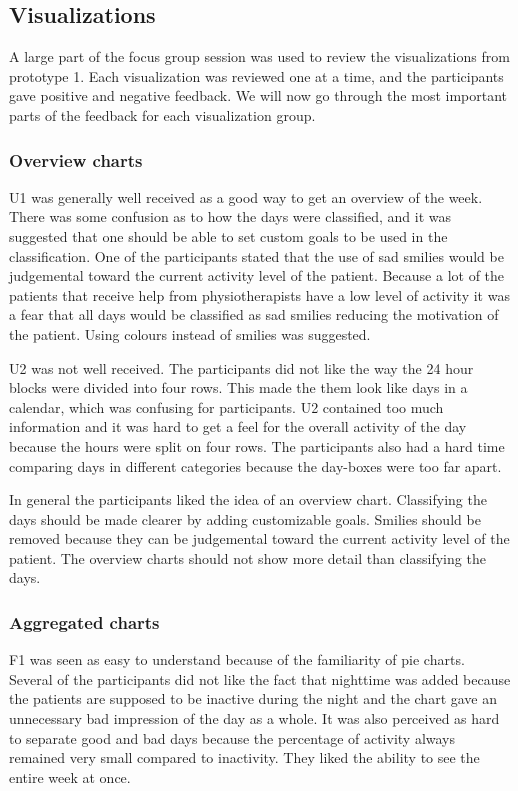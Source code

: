 \subsection{Visualizations}
A large part of the focus group session was used to review the visualizations from prototype 1. Each visualization was reviewed one at a time, and the participants gave positive and negative feedback. We will now go through the most important parts of the feedback for each visualization group.

\subsubsection{Overview charts}
U1 was generally well received as a good way to get an overview of the week. There was some confusion as to how the days were classified, and it was suggested that one should be able to set custom goals to be used in the classification. One of the participants stated that the use of sad smilies would be judgemental toward the current activity level of the patient. Because a lot of the patients that receive help from physiotherapists have a low level of activity it was a fear that all days would be classified as sad smilies reducing the motivation of the patient. Using colours instead of smilies was suggested.

U2 was not well received. The participants did not like the way the 24 hour blocks were divided into four rows. This made the them look like days in a calendar, which was confusing for participants. U2 contained too much information and it was hard to get a feel for the overall activity of the day because the hours were split on four rows. The participants also had a hard time comparing days in different categories because the day-boxes were too far apart.

In general the participants liked the idea of an overview chart. Classifying the days should be made clearer by adding customizable goals. Smilies should be removed because they can be judgemental toward the current activity level of the patient. The overview charts should not show more detail than classifying the days.

\subsubsection{Aggregated charts}
F1 was seen as easy to understand because of the familiarity of pie charts. Several of the participants did not like the fact that nighttime was added because the patients are supposed to be inactive during the night and the chart gave an unnecessary bad impression of the day as a whole. It was also perceived as hard to separate good and bad days because the percentage of activity always remained very small compared to inactivity. They liked the ability to see the entire week at once.

